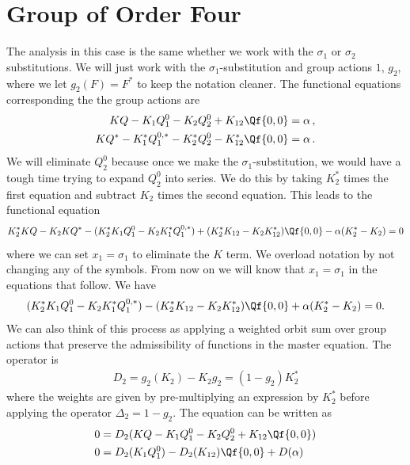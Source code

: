 \section{Group of Order Four}
The analysis in this case is the same whether we work with the $\sigma_1$ or $\sigma_2$ substitutions. We will just work with the $\sigma_1$-substitution and group actions $1$, $ g_2$, where we let $g_2(F) = F^\ast$ to keep the notation cleaner. The functional equations corresponding the the group actions are
\begin{align}
	KQ - K_1 Q_1^0 - K_2 Q_2^0 + K_{12}\Qf{0,0} &= \alpha\,,\\
	KQ^\ast - K_1^\ast Q_1^{0,\ast}- K_2^\ast Q_2^0 - K_{12}^\ast \Qf{0,0} &= \alpha\,.
\end{align}
We will eliminate $Q_2^0$ because once we make the $\sigma_1$-substitution, we would have a tough time trying to expand $Q_2^0$ into series. We do this by taking $K_2^\ast$ times the first equation and subtract $K_2$ times the second equation. This leads to the functional equation
\begin{align}
	K_2^\ast KQ - K_2 K Q^\ast- (K_2^\ast K_1 Q_1^0 - K_2 K_1^\ast Q_1^{0,\ast}) + (K_2^\ast K_{12}-K_2 K_{12}^\ast)\Qf{0,0} - \alpha(K_2^\ast - K_2) = 0
\end{align}
where we can set $x_1 = \sigma_1$ to eliminate the $K$ term. We overload notation by not changing any of the symbols. From now on we will know that $x_1 = \sigma_1$ in the equations that follow. We have
\begin{align}
	(K_2^\ast K_1 Q_1^0 - K_2 K_1^\ast Q_1^{0,\ast}) - (K_2^\ast K_{12}-K_2 K_{12}^\ast)\Qf{0,0} + \alpha(K_2^\ast - K_2) = 0.
\end{align}
We can also think of this process as applying a weighted orbit sum over group actions that preserve the admissibility of functions in the master equation. The operator is
\begin{align}
	D_2 = g_2(K_2) - K_2 g_2 = (1-g_2)K_2^\ast
\end{align}
where the weights are given by pre-multiplying an expression by $K_2^\ast$ before applying the operator $\Delta_2 = 1-g_2$. The equation can be written as
\begin{align}\begin{split}
	0 &= D_2(KQ - K_1 Q_1^0 - K_2 Q_2^0 + K_{12}\Qf{0,0})\\
	0 &= D_2(K_1Q_1^0) - D_2(K_{12})\Qf{0,0} + D(\alpha)	    
\end{split}\end{align}
